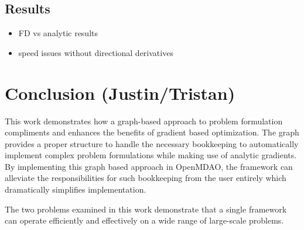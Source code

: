 \documentclass[]{aiaa-tc} %
\begin{document}
    \subsection{Results}
        \begin{itemize}
            \item FD vs analytic results
            \item speed issues without directional derivatives
        \end{itemize}
     

  \section{Conclusion (Justin/Tristan)}

      This work demonstrates how a graph-based approach to problem formulation compliments and enhances the benefits of gradient based
      optimization. The graph provides a proper structure to handle the necessary bookkeeping to automatically implement complex 
      problem formulations while making use of analytic gradients. By implementing this graph based approach in OpenMDAO, the framework 
      can alleviate the responsibilities for such bookkeeping from the user entirely which dramatically simplifies implementation. 

      The two problems examined in this work demonstrate that a single framework can operate efficiently and effectively on a wide range 
      of large-scale problems. 

  
\end{document}
